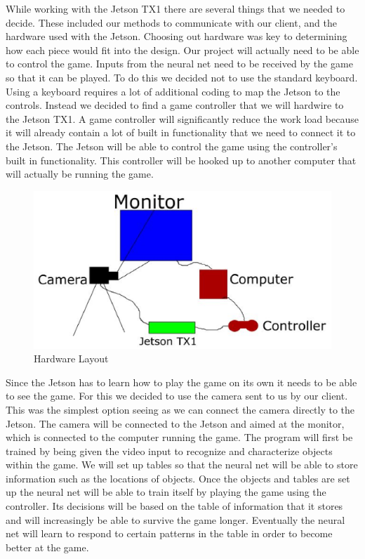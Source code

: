 \documentclass{onecolumn, draftclsnofoot,10pt, compsoc}[IEEEtran]
\begin{document}
While working with the Jetson TX1 there are several things that we needed to decide.
These included our methods to communicate with our client, and the hardware used with the Jetson.
Choosing out hardware was key to determining how each piece would fit into the design.
\newline
\newline
Our project will actually need to be able to control the game.
Inputs from the neural net need to be received by the game so that it can be played.
To do this we decided not to use the standard keyboard.
Using a keyboard requires a lot of additional coding to map the Jetson to the controls.
Instead we decided to find a game controller that we will hardwire to the Jetson TX1.
A game controller will significantly reduce the work load because it will already contain a lot of built in functionality that we need to connect it to the Jetson.
The Jetson will be able to control the game using the controller's built in functionality.
This controller will be hooked up to another computer that will actually be running the game.
\newline
\newline
\begin{figure}
  \includegraphics[width=\textwidth]{design.eps}
  \caption{Hardware Layout}
  \label{fig:4.2}
\end{figure}%
Since the Jetson has to learn how to play the game on its own it needs to be able to see the game.
For this we decided to use the camera sent to us by our client.
This was the simplest option seeing as we can connect the camera directly to the Jetson.
The camera will be connected to the Jetson and aimed at the monitor, which is connected to the computer running the game.
The program will first be trained by being given the video input to recognize and characterize objects within the game.
We will set up tables so that the neural net will be able to store information such as the locations of objects.
Once the objects and tables are set up the neural net will be able to train itself by playing the game using the controller.
Its decisions will be based on the table of information that it stores and will increasingly be able to survive the game longer.
Eventually the neural net will learn to respond to certain patterns in the table in order to become better at the game.
\end{document}
